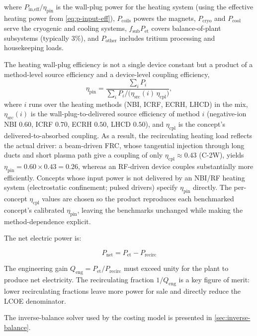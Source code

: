 \documentclass{article}
\begin{document}
\noindent where $P_{\text{in,eff}}/\eta_{\text{pin}}$ is the wall-plug
power for the heating system (using the effective heating power from
\cref{eq:p-input-eff}), $P_{\text{coils}}$ powers the magnets,
$P_{\text{cryo}}$ and $P_{\text{cool}}$ serve the cryogenic and cooling
systems, $f_{\text{sub}} P_{\text{et}}$ covers balance-of-plant
subsystems (typically 3\%), and $P_{\text{other}}$ includes tritium
processing and housekeeping loads.

The heating wall-plug efficiency is not a single device constant but a product
of a method-level source efficiency and a device-level coupling efficiency,
\begin{equation}
  \eta_{\text{pin}} = \frac{\sum_i P_i}{\sum_i P_i / \bigl(\eta_{\text{src}}(i)\,\eta_{\text{cpl}}\bigr)},
\end{equation}
where $i$ runs over the heating methods (NBI, ICRF, ECRH, LHCD) in the mix,
$\eta_{\text{src}}(i)$ is the wall-plug-to-delivered source efficiency of method
$i$ (negative-ion NBI $0.60$, ICRF $0.70$, ECRH $0.50$, LHCD $0.50$), and
$\eta_{\text{cpl}}$ is the concept's delivered-to-absorbed coupling. As a result,
the recirculating heating load reflects the actual driver: a beam-driven FRC,
whose tangential injection through long ducts and short plasma path give a
coupling of only $\eta_{\text{cpl}} \approx 0.43$ (C-2W), yields
$\eta_{\text{pin}} = 0.60 \times 0.43 = 0.26$, whereas an RF-driven device
couples substantially more efficiently. Concepts whose input power is not delivered by an NBI/RF
heating system (electrostatic confinement; pulsed drivers) specify
$\eta_{\text{pin}}$ directly. The per-concept $\eta_{\text{cpl}}$ values are
chosen so the product reproduces each benchmarked concept's calibrated
$\eta_{\text{pin}}$, leaving the benchmarks unchanged while making the
method-dependence explicit.

The net electric power is:

\begin{equation}
\label{eq:p-net}
P_{\text{net}} = P_{\text{et}} - P_{\text{recirc}}
\end{equation}

\noindent The engineering gain $Q_{\text{eng}} = P_{\text{et}} /
P_{\text{recirc}}$ must exceed unity for the plant to produce net
electricity. The recirculating fraction
$1/Q_{\text{eng}}$ is a key figure of merit: lower recirculating
fractions leave more power for sale and directly reduce the LCOE
denominator.

The inverse-balance solver used by the costing model is presented in
\cref{sec:inverse-balance}.
\end{document}

